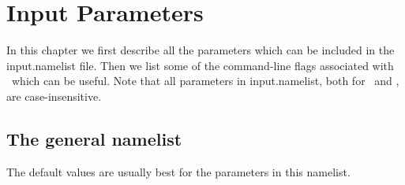 \chapter{Input Parameters}
\label{ch:input}

\newcommand{\param}[5]{{\setlength{\parindent}{0cm} {\ttfamily \bfseries \hypertarget{#1}{#1}}\\{\it Type}: #2\\{\it Default}: #3\\{\it When it matters}: #4\\{\it Meaning}: #5}}
\newcommand{\ssparam}[4]{{\setlength{\parindent}{0cm} {\ttfamily \bfseries \hypertarget{#1}{#1}}\\{\it Type}: #2\\{\it When it matters}: #3\\{\it Meaning}: #4}}
\newcommand{\PETScParam}[2]{{\setlength{\parindent}{0cm} {\ttfamily \bfseries #1}\\{\it Meaning}: #2}}
\newcommand{\myhrule}{{\setlength{\parindent}{0cm} \hrulefill }}

\newcommand{\true}{{\ttfamily .true.}}
\newcommand{\false}{{\ttfamily .false.}}

In this chapter we first describe all the parameters which can be included in the {\ttfamily input.namelist} file. 
Then we list some of the command-line flags associated with \PETSc~which can be useful.
Note that all parameters in {\ttfamily input.namelist}, both for \sfincs~and \sfincsScan,
are case-insensitive.




\section{The {\ttfamily general} namelist}

The default values are usually best for the parameters in this namelist.

\myhrule


